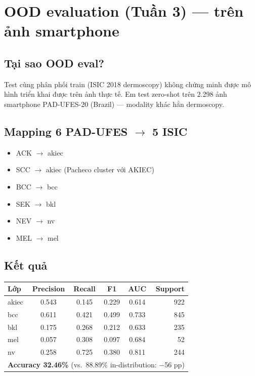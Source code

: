 \documentclass[11pt,a4paper]{article}
\begin{document}
\section{OOD evaluation (Tuần 3) --- trên ảnh smartphone}

\subsection{Tại sao OOD eval?}

\begin{simple}
Test cùng phân phối train (ISIC 2018 dermoscopy) không chứng minh được mô hình triển khai được trên ảnh thực tế. Em test zero-shot trên 2.298 ảnh smartphone PAD-UFES-20 (Brazil) --- modality khác hẳn dermoscopy.
\end{simple}

\subsection{Mapping 6 PAD-UFES $\to$ 5 ISIC}

\begin{itemize}[leftmargin=*]
  \item ACK $\to$ akiec
  \item SCC $\to$ akiec (Pacheco cluster với AKIEC)
  \item BCC $\to$ bcc
  \item SEK $\to$ bkl
  \item NEV $\to$ nv
  \item MEL $\to$ mel
\end{itemize}

\subsection{Kết quả}

\begin{table}[h]
\centering\small
\begin{tabular}{lccccr}
\toprule
\textbf{Lớp} & \textbf{Precision} & \textbf{Recall} & \textbf{F1} & \textbf{AUC} & \textbf{Support} \\
\midrule
akiec & 0.543 & 0.145 & 0.229 & 0.614 & 922 \\
bcc   & 0.611 & 0.421 & 0.499 & 0.733 & 845 \\
bkl   & 0.175 & 0.268 & 0.212 & 0.633 & 235 \\
mel   & 0.057 & 0.308 & 0.097 & 0.684 &  52 \\
nv    & 0.258 & 0.725 & 0.380 & 0.811 & 244 \\
\midrule
\multicolumn{6}{l}{\textbf{Accuracy 32.46\%} (vs.\ 88.89\% in-distribution: $-$56 pp)} \\
\bottomrule
\end{tabular}
\end{table}
\end{document}
